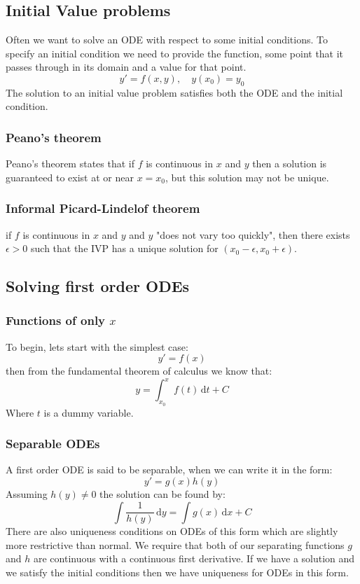 \documentclass[12pt]{article}
\begin{document}
\subsection*{Initial Value problems}
Often we want to solve an ODE with respect to some initial conditions. To specify an initial condition we need to provide the function, some point that it passes through in its domain and a value for that point.
\[y'=f(x,y),\quad y(x_0)=y_0\]
The solution to an initial value problem satisfies both the ODE and the initial condition.
\subsubsection*{Peano's theorem}
Peano's theorem states that if \(f\) is continuous in \(x\) and \(y\) then a solution is guaranteed to exist at or near \(x=x_0\), but this solution may not be unique.
\subsubsection*{Informal Picard-Lindelof theorem}
if \(f\) is continuous in \(x\) and \(y\) and \(y\) "does not vary too quickly", then there exists \(\epsilon>0\) such that the IVP has a unique solution for \((x_0-\epsilon,x_0+\epsilon)\).
\subsection*{Solving first order ODEs}
\subsubsection*{Functions of only \(x\)}
To begin, lets start with the simplest case:
\[y'=f(x)\]
then from the fundamental theorem of calculus we know that:
\[y=\int_{x_0}^xf(t)\,\text{d}t+C\]
Where \(t\) is a dummy variable.
\subsubsection*{Separable ODEs}
A first order ODE is said to be separable, when we can write it in the form:
\[y'=g(x)h(y)\]
Assuming \(h(y)\ne0\) the solution can be found by:
\[\int\frac{1}{h(y)}\,\text{d}y=\int g(x)\,\text{d}x+C\]
There are also uniqueness conditions on ODEs of this form which are slightly more restrictive than normal. We require that both of our separating functions \(g\) and \(h\) are continuous with a continuous first derivative. If we have a solution and we satisfy the initial conditions then we have uniqueness for ODEs in this form.
\end{document}
